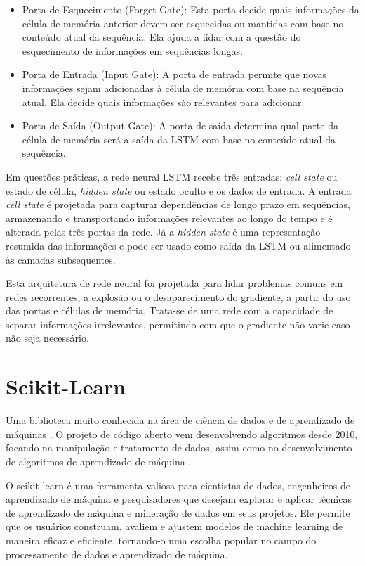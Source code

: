 \begin{itemize}
    \item Porta de Esquecimento (Forget Gate): Esta porta decide quais informações da célula de memória anterior devem ser esquecidas ou mantidas com base no conteúdo atual da sequência. Ela ajuda a lidar com a questão do esquecimento de informações em sequências longas.
    
    \item Porta de Entrada (Input Gate): A porta de entrada permite que novas informações sejam adicionadas à célula de memória com base na sequência atual. Ela decide quais informações são relevantes para adicionar.
    
    \item Porta de Saída (Output Gate): A porta de saída determina qual parte da célula de memória será a saída da LSTM com base no conteúdo atual da sequência.
    
\end{itemize}

Em questões práticas, a rede neural LSTM recebe três entradas: \textit{cell state} ou estado de célula, \textit{hidden state} ou estado oculto e os dados de entrada. A entrada \textit{cell state} é projetada para capturar dependências de longo prazo em sequências, armazenando e transportando informações relevantes ao longo do tempo e é alterada pelas três portas da rede. Já a \textit{hidden state} é uma representação resumida das informações e pode ser usado como saída da LSTM ou alimentado às camadas subsequentes.

Esta arquitetura de rede neural foi projetada para lidar problemas comuns em redes recorrentes, a explosão ou o desaparecimento do gradiente, a partir do uso das portas e células de memória. Trata-se de uma rede com a capacidade de separar informações irrelevantes, permitindo com que o gradiente não varie caso não seja necessário.

\section{Scikit-Learn}

Uma biblioteca muito conhecida na área de ciência de dados e de aprendizado de máquinas \cite{sklearn_api}. O projeto de código aberto vem desenvolvendo algoritmos desde 2010, focando na manipulação e tratamento de dados, assim como no desenvolvimento de algoritmos de aprendizado de máquina \cite{scikit-learn}.

O scikit-learn é uma ferramenta valiosa para cientistas de dados, engenheiros de aprendizado de máquina e pesquisadores que desejam explorar e aplicar técnicas de aprendizado de máquina e mineração de dados em seus projetos. Ele permite que os usuários construam, avaliem e ajustem modelos de machine learning de maneira eficaz e eficiente, tornando-o uma escolha popular no campo do processamento de dados e aprendizado de máquina.


